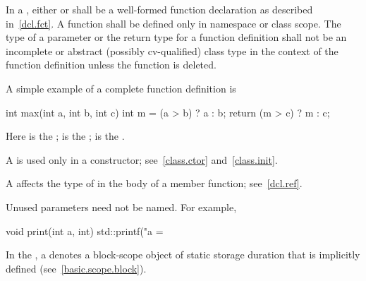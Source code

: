 \pnum
In a ,
either   \tcode{;}
or  \tcode{;}
shall be a well-formed function declaration
as described in~\ref{dcl.fct}.
A function shall be defined only in namespace or class scope.
The type of a parameter or the return type for a function
definition shall not be
an incomplete or abstract (possibly cv-qualified) class type
in the context of the function definition
unless the function is deleted.

\pnum
\begin{example}
A simple example of a complete function definition is

\begin{codeblock}
int max(int a, int b, int c) {
  int m = (a > b) ? a : b;
  return (m > c) ? m : c;
}
\end{codeblock}

Here
is the
;
is the
;
\tcode{\{ \commentellip{} \}}
is the
.
\end{example}

\pnum
{}%
%
%
A
is used only in a constructor; see~\ref{class.ctor} and~\ref{class.init}.

\pnum
\begin{note}
A  affects the type of 
in the body of a member function; see~\ref{dcl.ref}.
\end{note}

\pnum
\begin{note}
Unused parameters need not be named.
For example,

\begin{codeblock}
void print(int a, int) {
  std::printf("a = %
}
\end{codeblock}
\end{note}

\pnum
In the , a
 denotes a block-scope object of static
storage duration that is implicitly defined (see~\ref{basic.scope.block}).

